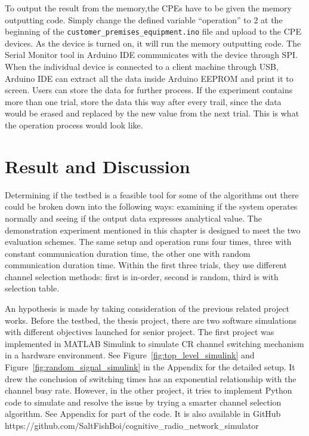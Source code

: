 To output the result from the memory,the CPEs have to be given the memory outputting code. Simply change the defined variable ``operation'' to 2 at the beginning of the \texttt{customer\_premises\_equipment.ino} file and upload to the CPE devices. As the device is turned on, it will run the memory outputting code. The Serial Monitor tool in Arduino IDE communicates with the device through SPI. When the individual device is connected to a client machine through USB, Arduino IDE can extract all the data inside Arduino EEPROM and print it to screen. Users can store the data for further process. If the experiment contains more than one trial, store the data this way after every trail, since the data would be erased and replaced by the new value from the next trial. This is what the operation process would look like. 


\section{Result and Discussion}

Determining if the testbed is a feasible tool for some of the algorithms out there could be broken down into the following ways: examining if the system operates normally and seeing if the output data expresses analytical value. The demonstration experiment mentioned in this chapter is designed to meet the two evaluation schemes. The same setup and operation runs four times, three with constant communication duration time, the other one with random communication duration time. Within the first three trials, they use different channel selection methods: first is in-order, second is random, third is with selection table. 

An hypothesis is made by taking consideration of the previous related project works. Before the testbed, the thesis project, there are two software simulations with different objectives launched for senior project. The first project was implemented in MATLAB Simulink to simulate CR channel switching mechanism in a hardware environment. See Figure~\ref{fig:top_level_simulink} and Figure~\ref{fig:random_signal_simulink} in the Appendix for the detailed setup. It drew the conclusion of switching times has an exponential relationship with the channel busy rate. However, in the other project, it tries to implement Python code to simulate and resolve the issue by trying a smarter channel selection algorithm. See Appendix for part of the code. It is also available in GitHub
https://github.com/SaltFishBoi/cognitive\_radio\_network\_simulator


